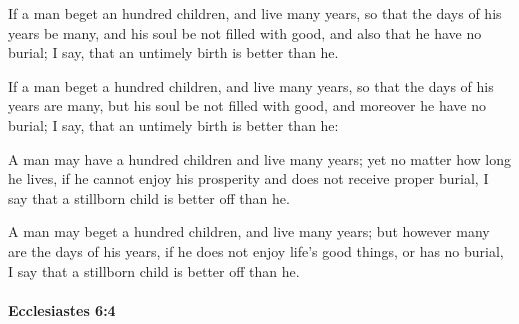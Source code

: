 			If a man beget an hundred children, and live many years, so that the days of his years be many, and his soul be not filled with good, and also that he have no burial; I say, that an untimely birth is better than he.

			\begin{versebox}
					\item[BHS] 
					\item[LXX] 
					\item[ASV] If a man beget a hundred children, and live many years, so that the days of his years are many, but his soul be not filled with good, and moreover he have no burial; I say, that an untimely birth is better than he:
					\item[NIV] A man may have a hundred children and live many years; yet no matter how long he lives, if he cannot enjoy his prosperity and does not receive proper burial, I say that a stillborn child is better off than he.
					\item[NRSV] A man may beget a hundred children, and live many years; but however many are the days of his years, if he does not enjoy life’s good things, or has no burial, I say that a stillborn child is better off than he.
			\end{versebox}

		\paragraph{Ecclesiastes 6:4} %
			\label{ECCLESIASTES-6-4}

